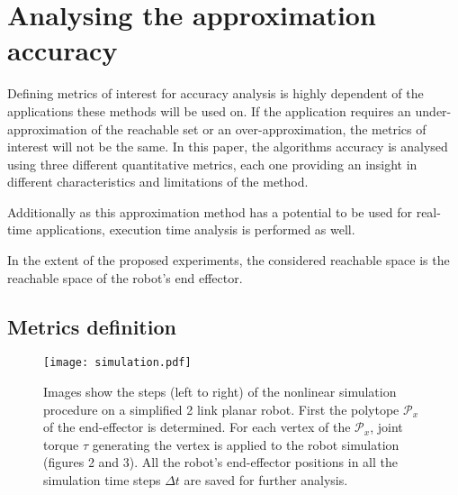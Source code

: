\section{Analysing the approximation accuracy}
\label{ch:analysis}

Defining metrics of interest for accuracy analysis is highly dependent of the applications these methods will be used on. If the application requires an under-approximation of the reachable set or an over-approximation, the metrics of interest will not be the same. In this paper, the algorithms accuracy is analysed using three different quantitative metrics, each one providing an insight in different characteristics and limitations of the method. 

Additionally as this approximation method has a potential to be used for real-time applications, execution time analysis is performed as well. 

In the extent of the proposed experiments, the considered reachable space is the reachable space of the robot's end effector. 

\subsection{Metrics definition}


\begin{figure}[!t]
    \centering
    \texttt{[image: simulation.pdf]}
    \caption{Images show the steps (left to right) of the nonlinear simulation procedure on a simplified 2 link planar robot. First the polytope $\mathcal{P}_x$ of the end-effector is determined. For each vertex of the $\mathcal{P}_x$, joint torque $\tau$ generating the vertex is applied to the robot simulation (figures 2 and 3). All the robot's end-effector positions in all the simulation time steps $\Delta t$ are saved for further analysis.}
    \label{fig:simulation}
\vspace{-0.3cm}
\end{figure}

